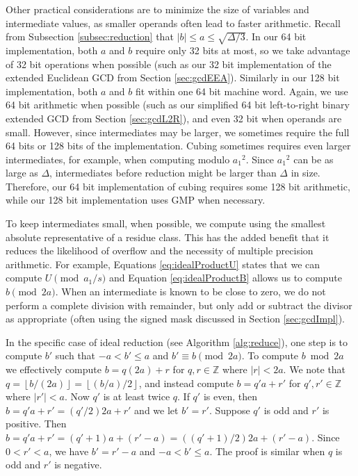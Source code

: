 \documentclass{ucalgthes1}
\theoremstyle{definition}
\newcommand{\ZZ}{\mathbb{Z}}
\newcommand{\floor}[1]{\left\lfloor #1 \right\rfloor}
\begin{document}
Other practical considerations are to minimize the size of variables and intermediate values, as smaller operands often lead to faster arithmetic.  Recall from Subsection \ref{subsec:reduction} that $|b| \le a \le \sqrt{\Delta/3}$.  In our 64 bit implementation, both $a$ and $b$ require only 32 bits at most, so we take advantage of 32 bit operations when possible (such as our 32 bit implementation of the extended Euclidean GCD from Section \ref{sec:gcdEEA}).  Similarly in our 128 bit implementation, both $a$ and $b$ fit within one 64 bit machine word.  Again, we use 64 bit arithmetic when possible (such as our simplified 64 bit left-to-right binary extended GCD from Section \ref{sec:gcdL2R}), and even 32 bit when operands are small.  However, since intermediates may be larger, we sometimes require the full 64 bits or 128 bits of the implementation.  Cubing sometimes requires even larger intermediates, for example, when computing modulo ${a_1}^2$.  Since ${a_1}^2$ can be as large as $\Delta$, intermediates before reduction might be larger than $\Delta$ in size.  Therefore, our 64 bit implementation of cubing requires some 128 bit arithmetic, while our 128 bit implementation uses GMP when necessary.

To keep intermediates small, when possible, we compute using the smallest absolute representative of a residue class.  This has the added benefit that it reduces the likelihood of overflow and the necessity of multiple precision arithmetic.  For example, Equations \eqref{eq:idealProductU} states that we can compute $U \pmod {a_1/s}$ and Equation \eqref{eq:idealProductB} allows us to compute $b \pmod{2a}$.  When an intermediate is known to be close to zero, we do not perform a complete division with remainder, but only add or subtract the divisor as appropriate (often using the signed mask discussed in Section \ref{sec:gcdImpl}).

In the specific case of ideal reduction (see Algorithm \ref{alg:reduce}), one step is to compute $b'$ such that $-a < b' \le a$ and $b' \equiv b \pmod{2a}$.  To compute $b \bmod{2a}$ we effectively compute $b = q(2a) + r$ for $q, r \in \ZZ$ where $|r| < 2a$.  We note that $q = \floor{b/(2a)} = \floor{(b/a)/2}$, and instead compute $b = q'a+r'$ for $q', r' \in \ZZ$ where $|r'| < a$.  Now $q'$ is at least twice $q$.  If $q'$ is even, then $b = q'a + r' = (q'/2)2a + r'$ and we let $b' = r'$. Suppose $q'$ is odd and $r'$ is positive.  Then $b = q'a + r' = (q' + 1)a + (r' - a) = ((q' + 1)/2)2a + (r' - a)$.  Since $0 < r' < a$, we have $b' = r' - a$ and $-a < b' \le a$.  The proof is similar when $q$ is odd and $r'$ is negative.
\end{document}
